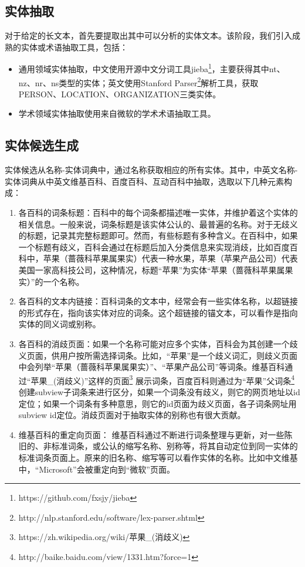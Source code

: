 \subsection{实体抽取}
对于给定的长文本，首先要提取出其中可以分析的实体文本。该阶段，我们引入成熟的实体或术语抽取工具，包括：
\begin{itemize}
\item 通用领域实体抽取，中文使用开源中文分词工具jieba\footnote{https://github.com/fxsjy/jieba}，主要获得其中nt、nz、nr、ns类型的实体；英文使用Stanford Parser\footnote{http://nlp.stanford.edu/software/lex-parser.shtml}解析工具，获取PERSON、LOCATION、ORGANIZATION三类实体。
\item 学术领域实体抽取使用来自微软的学术术语抽取工具。
\end{itemize}

\subsection{实体候选生成}

实体候选从名称-实体词典中，通过名称获取相应的所有实体。其中，中英文名称-实体词典从中英文维基百科、百度百科、互动百科中抽取，选取以下几种元素构成：

\begin{enumerate}[1.]
\item 各百科的词条标题：百科中的每个词条都描述唯一实体，并维护着这个实体的相关信息。一般来说，词条标题是该实体公认的、最普遍的名称。对于无歧义的标题，记录其完整标题即可。然而，有些标题有多种含义。在百科中，如果一个标题有歧义，百科会通过在标题后加入分类信息来实现消歧，比如百度百科中，苹果（蔷薇科苹果属果实）代表一种水果，苹果（苹果产品公司）代表美国一家高科技公司，这种情况，标题“苹果”为实体“苹果（蔷薇科苹果属果实）”的一个名称。
\item 各百科的文本内链接：百科词条的文本中，经常会有一些实体名称，以超链接的形式存在，指向该实体对应的词条。这个超链接的锚文本，可以看作是指向实体的同义词或别称。
\item 各百科的消歧页面：如果一个名称可能对应多个实体，百科会为其创建一个歧义页面，供用户按所需选择词条。比如，“苹果”是一个歧义词汇，则歧义页面中会列举“苹果（蔷薇科苹果属果实）”、“苹果产品公司”等词条。维基百科通过“苹果\_(消歧义)”这样的页面\footnote{https://zh.wikipedia.org/wiki/苹果\_(消歧义)}
展示词条，百度百科则通过为“苹果”父词条\footnote{http://baike.baidu.com/view/1331.htm?force=1}创建subview子词条来进行区分，如果一个词条没有歧义，则它的网页地址以id定位；如果一个词条有多种意思，则它的id页面为歧义页面，各子词条网址用subview id定位。消歧页面对于抽取实体的别称也有很大贡献。
\item 维基百科的重定向页面： 维基百科通过不断进行词条整理与更新，对一些陈旧的、非标准词条，或公认的缩写名称、别称等，将其自动定位到同一实体的标准词条页面上。原来的旧名称、缩写等可以看作实体的名称。比如中文维基中，“Microsoft”会被重定向到“微软”页面。
\end{enumerate}

